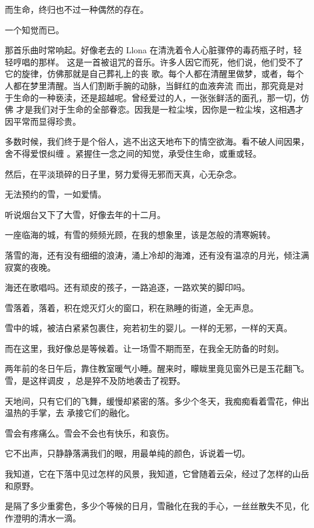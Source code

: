 \documentclass[12pt,a4paper]{article}
\begin{document}
		而生命，终归也不过一种偶然的存在。

		一个知觉而已。

		那首乐曲时常响起。好像老去的 Llona 在清洗着令人心脏骤停的毒药瓶子时，轻轻哼唱的那样。
	这是一首被诅咒的音乐。许多人因它而死，他们说，他们受不了它的旋律，仿佛那就是自己葬礼上的丧
	歌。每个人都在清醒里做梦，或者，每个人都在梦里清醒。当人们割断手腕的动脉，当鲜红的血液奔流
	而出，那究竟是对于生命的一种亵渎，还是超越呢。曾经爱过的人，一张张鲜活的面孔，那一切，仿佛
	才是我们对于生命的全部眷恋。因我是一粒尘埃，因你是一粒尘埃，这相遇才因平常而显得珍贵。

		多数时候，我们终于是个俗人，逃不出这天地布下的情空欲海。看不破人间因果，舍不得爱恨纠缠
	。紧握住一念之间的知觉，承受住生命，或重或轻。

		然后，在平淡琐碎的日子里，努力爱得无邪而天真，心无杂念。

	\endwriting



		无法预约的雪，一如爱情。


		听说烟台又下了大雪，好像去年的十二月。\par
		一座临海的城，有雪的频频光顾，在我的想象里，该是怎般的清寒婉转。\par
		落雪的海，还有没有细细的浪涛，涌上冷却的海滩，还有没有温凉的月光，倾注满寂寞的夜晚。\par
		海还在歌唱吗。还有顽皮的孩子，一路追逐，一路欢笑的脚印吗。\par
		雪落着，落着，积在熄灭灯火的窗口，积在熟睡的街道，全无声息。\par
		雪中的城，被洁白紧紧包裹住，宛若初生的婴儿。一样的无邪，一样的天真。

		而在这里，我好像总是等候着。让一场雪不期而至，在我全无防备的时刻。

		两年前的冬日午后，靠住教室暖气小睡。醒来时，矇眬里竟见窗外已是玉花翻飞。雪，是这样调皮
	，总是猝不及防地袭击了视野。

		天地间，只有它们的飞舞，缓慢却紧密的落。多少个冬天，我痴痴看着雪花，伸出温热的手掌，去
	承接它们的融化。

		雪会有疼痛么。雪会不会也有快乐，和哀伤。\par
		它不出声，只静静落满我们的眼，用最单纯的颜色，诉说着一切。\par
		我知道，它在下落中见过怎样的风景，我知道，它曾随着云朵，经过了怎样的山岳和原野。\par
		是隔了多少重雾色，多少个等候的日月，雪融化在我的手心，一丝丝散失不见，化作澄明的清水一滴。
\end{document}
